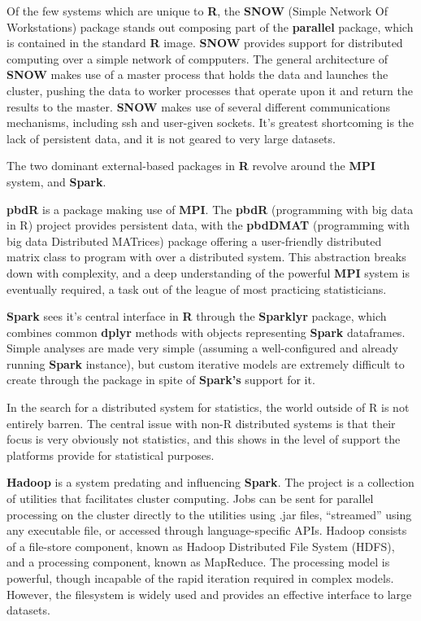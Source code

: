 Of the few systems which are unique to \textbf{R}, the \textbf{SNOW} (Simple Network Of Workstations) package stands out composing part of the \textbf{parallel} package, which is contained in the standard \textbf{R} image.
\textbf{SNOW} provides support for distributed computing over a simple network of compputers.
The general architecture of \textbf{SNOW} makes use of a master process that holds the data and launches the cluster, pushing the data to worker processes that operate upon it and return the results to the master.
\textbf{SNOW} makes use of several different communications mechanisms, including ssh and user-given sockets.
It's greatest shortcoming is the lack of persistent data, and it is not geared to very large datasets.

The two dominant external-based packages in \textbf{R} revolve around the \textbf{MPI} system, and \textbf{Spark}.

\textbf{pbdR} is a package making use of \textbf{MPI}.
The \textbf{pbdR} (programming with big data in R) project provides persistent data, with the \textbf{pbdDMAT} (programming with big data Distributed MATrices) package offering a user-friendly distributed matrix class to program with over a distributed system.
This abstraction breaks down with complexity, and a deep understanding of the powerful \textbf{MPI} system is eventually required, a task out of the league of most practicing statisticians.

\textbf{Spark} sees it's central interface in \textbf{R} through the \textbf{Sparklyr} package, which combines common \textbf{dplyr} methods with objects representing \textbf{Spark} dataframes.
Simple analyses are made very simple (assuming a well-configured and already running \textbf{Spark} instance), but custom iterative models are extremely difficult to create through the package in spite of \textbf{Spark's} support for it.

In the search for a distributed system for statistics, the world outside of R is not entirely barren.
The central issue with non-R distributed systems is that their focus is very obviously not statistics, and this shows in the level of support the platforms provide for statistical purposes.

\textbf{Hadoop} is a system predating and influencing \textbf{Spark}.
The project is a collection of utilities that facilitates cluster computing.
Jobs can be sent for parallel processing on the cluster directly to the utilities using .jar files, ``streamed'' using any executable file, or accessed through language-specific APIs.
Hadoop consists of a file-store component, known as Hadoop Distributed File System (HDFS), and a processing component, known as MapReduce.
The processing model is powerful, though incapable of the rapid iteration required in complex models.
However, the filesystem is widely used and provides an effective interface to large datasets.

